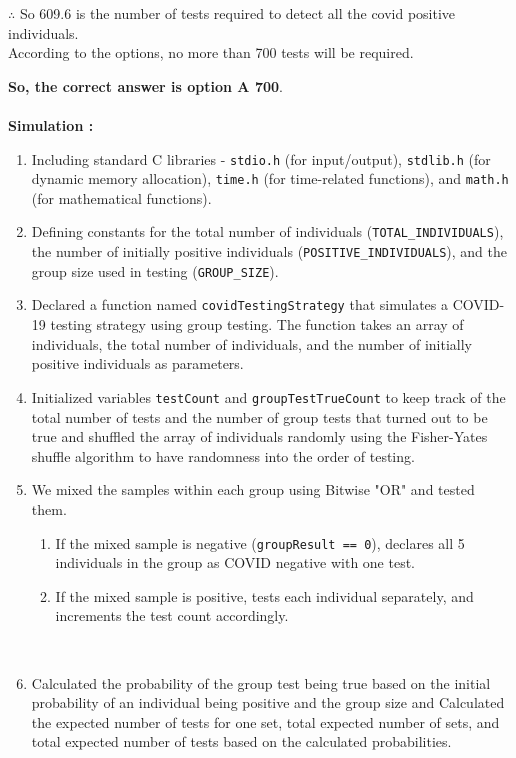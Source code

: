 \documentclass[journal,12pt,onecolumn]{IEEEtran}
\begin{document}
$\therefore$ So 609.6 is the number of tests required to detect all the covid positive individuals. \\
According to the options, no more than 700 tests will be required.

\textbf{So, the correct answer is option A 700}. \\ \\
\textbf{Simulation :} \\ 
\begin{enumerate}
    \item Including standard C libraries - \texttt{stdio.h} (for input/output), \texttt{stdlib.h} (for dynamic memory allocation), \texttt{time.h} (for time-related functions), and \texttt{math.h} (for mathematical functions). \\
    \item Defining constants for the total number of individuals (\texttt{TOTAL\_INDIVIDUALS}), the number of initially positive individuals (\texttt{POSITIVE\_INDIVIDUALS}), and the group size used in testing (\texttt{GROUP\_SIZE}). \\
    \item Declared a function named \texttt{covidTestingStrategy} that simulates a COVID-19 testing strategy using group testing. The function takes an array of individuals, the total number of individuals, and the number of initially positive individuals as parameters. \\
    \item Initialized variables \texttt{testCount} and \texttt{groupTestTrueCount} to keep track of the total number of tests and the number of group tests that turned out to be true and shuffled the array of individuals randomly using the Fisher-Yates shuffle algorithm to have randomness into the order of testing. \\
    \item We mixed the samples within each group using Bitwise "OR" and tested them.
    \begin{enumerate}
        \item If the mixed sample is negative (\texttt{groupResult == 0}), declares all 5 individuals in the group as COVID negative with one test.
        \item If the mixed sample is positive, tests each individual separately, and increments the test count accordingly.
    \end{enumerate} \\
    \item Calculated the probability of the group test being true based on the initial probability of an individual being positive and the group size and Calculated the expected number of tests for one set, total expected number of sets, and total expected number of tests based on the calculated probabilities. \\

\end{enumerate}
\end{document}

